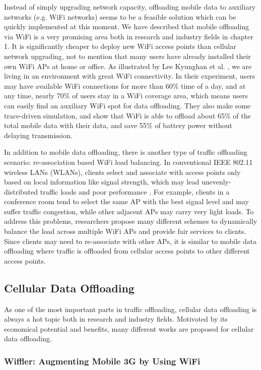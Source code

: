 \documentclass[english]{tktltiki}
\begin{document}
Instead of simply upgrading network capacity, offloading mobile data to auxiliary networks (e.g. WiFi networks) seems to be a feasible solution which can be quickly implemented at this moment. We have described that mobile offloading via WiFi is a very promising area both in research and industry fields in chapter 1. It is significantly cheaper to deploy new WiFi access points than cellular network upgrading, not to mention that many users have already installed their own WiFi APs at home or office. As illustrated by Lee Kyunghan et al. \cite{lly+10}, we are living in an environment with great WiFi connectivity. In their experiment, users may have available WiFi connections for more than 60\% time of a day, and at any time, nearly 70\% of users stay in a WiFi coverage area, which means users can easily find an auxiliary WiFi spot for data offloading. They also make some trace-driven simulation, and show that WiFi is able to offload about 65\% of the total mobile data with their data, and save 55\% of battery power without delaying transmission.

In addition to mobile data offloading, there is another type of traffic offloading scenario: re-association based WiFi load balancing. In conventional IEEE 802.11 wireless LANs (WLANs), clients select and associate with access points only based on local information like signal strength, which may lead unevenly-distributed traffic loads and poor performance \cite{bc03}. For example, clients in a conference room tend to select the same AP with the best signal level and may suffer traffic congestion, while other adjacent APs may carry very light loads. To address this problems, researchers propose many different schemes to dynamically balance the load across multiple WiFi APs and provide fair services to clients. Since clients may need to re-associate with other APs, it is similar to mobile data offloading where traffic is offloaded from cellular access points to other different access points.

\subsection{Cellular Data Offloading}

As one of the most important parts in traffic offloading, cellular data offloading is always a hot topic both in research and industry fields. Motivated by its economical potential and benefits, many different works are proposed for cellular data offloading.

\subsubsection{Wiffler: Augmenting Mobile 3G by Using WiFi}
\end{document}

